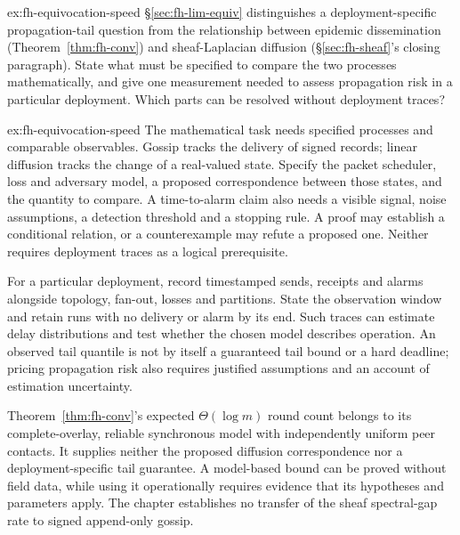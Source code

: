 \documentclass[11pt,a4paper]{article}
\theoremstyle{definition}
\theoremstyle{remark}
\begin{document}
\begin{pdexercise}[kind=Open,rating=3]{ex:fh-equivocation-speed}
\S\ref{sec:fh-lim-equiv} distinguishes a deployment-specific propagation-tail question from the relationship between epidemic dissemination (Theorem~\ref{thm:fh-conv}) and sheaf-Laplacian diffusion (\S\ref{sec:fh-sheaf}'s closing paragraph). State what must be specified to compare the two processes mathematically, and give one measurement needed to assess propagation risk in a particular deployment. Which parts can be resolved without deployment traces?
\end{pdexercise}
\begin{pdsolution}{ex:fh-equivocation-speed}
The mathematical task needs specified processes and comparable observables.
Gossip tracks the delivery of signed records; linear diffusion tracks the
change of a real-valued state. Specify the packet scheduler, loss and adversary
model, a proposed correspondence between those states, and the quantity to
compare. A time-to-alarm claim also needs a visible signal, noise assumptions,
a detection threshold and a stopping rule. A proof may establish a conditional
relation, or a counterexample may refute a proposed one. Neither requires
deployment traces as a logical prerequisite.

For a particular deployment, record timestamped sends, receipts and alarms
alongside topology, fan-out, losses and partitions. State the observation
window and retain runs with no delivery or alarm by its end. Such traces can
estimate delay distributions and test whether the chosen model describes
operation. An observed tail quantile is not by itself a guaranteed tail bound
or a hard deadline; pricing propagation risk also requires justified
assumptions and an account of estimation uncertainty.

Theorem~\ref{thm:fh-conv}'s expected $\Theta(\log m)$ round count belongs to
its complete-overlay, reliable synchronous model with independently uniform
peer contacts. It supplies neither the proposed diffusion correspondence nor
a deployment-specific tail guarantee. A model-based bound can be proved
without field data, while using it operationally requires evidence that its
hypotheses and parameters apply. The chapter establishes no transfer of the
sheaf spectral-gap rate to signed append-only gossip.
\end{pdsolution}
\end{document}
